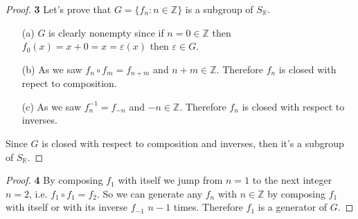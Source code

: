 \documentclass[11pt]{article}
\begin{document}
\cleardoublepage
	\begin{proof}{\textbf{3}} Let's prove that $G = \{f_n:n \in \mathbb{Z}\}$ is a subgroup of $S_{\mathbb{R}}$.
		\begin{itemize}
			\item[(a)] $G$ is clearly nonempty since if $n = 0 \in \mathbb{Z}$ then $f_0(x)=x+0 = x = \varepsilon(x)$ then $\varepsilon \in G$.
			\item[(b)] As we saw $f_n \circ f_m = f_{n+m}$ and $n+m \in \mathbb{Z}$. Therefore $f_n$ is closed with repect to composition.
			\item[(c)] As we saw $f^{-1}_n = f_{-n}$ and $-n \in \mathbb{Z}$. Therefore $f_n$ is closed with respect to inverses.
		\end{itemize}
		Since $G$ is closed with respect to composition and inverses, then it's a subgroup of $S_{\mathbb{R}}$.
	\end{proof}
	\begin{proof}{\textbf{4}}
		By composing $f_1$ with itself we jump from $n=1$ to the next integer $n=2$, i.e. $f_1 \circ f_1 = f_2$. So we can generate any $f_n$ with $n \in \mathbb{Z}$ by composing $f_1$ with itself or with its inverse $f_{-1}$ $n - 1$ times. Therefore $f_1$ is a generator of $G$.
	\end{proof}
\end{document}
